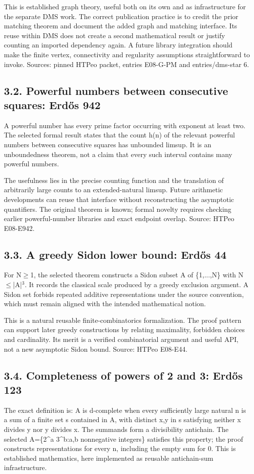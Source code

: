 \documentclass[11pt,a4paper]{article}
\begin{document}
This is established graph theory, useful both on its own and as infrastructure for the separate DMS work. The correct publication practice is to credit the prior matching theorem and document the added graph and matching interface. Its reuse within DMS does not create a second mathematical result or justify counting an imported dependency again. A future library integration should make the finite vertex, connectivity and regularity assumptions straightforward to invoke. Sources: pinned HTPeo packet, entries E08-G-PM and entries/dms-star 6.

\subsection{3.2. Powerful numbers between consecutive squares: Erdős 942}
A powerful number has every prime factor occurring with exponent at least two. The selected formal result states that the count h(n) of the relevant powerful numbers between consecutive squares has unbounded limsup. It is an unboundedness theorem, not a claim that every such interval contains many powerful numbers.

The usefulness lies in the precise counting function and the translation of arbitrarily large counts to an extended-natural limsup. Future arithmetic developments can reuse that interface without reconstructing the asymptotic quantifiers. The original theorem is known; formal novelty requires checking earlier powerful-number libraries and exact endpoint overlap. Source: HTPeo E08-E942.

\subsection{3.3. A greedy Sidon lower bound: Erdős 44}
For N\ensuremath{\geq}1, the selected theorem constructs a Sidon subset A of \{1,...,N\} with N\ensuremath{\leq}|A|\ensuremath{^3}. It records the classical scale produced by a greedy exclusion argument. A Sidon set forbids repeated additive representations under the source convention, which must remain aligned with the intended mathematical notion.

This is a natural reusable finite-combinatorics formalization. The proof pattern can support later greedy constructions by relating maximality, forbidden choices and cardinality. Its merit is a verified combinatorial argument and useful API, not a new asymptotic Sidon bound. Source: HTPeo E08-E44.

\subsection{3.4. Completeness of powers of 2 and 3: Erdős 123}
The exact definition is: A is d-complete when every sufficiently large natural n is a sum of a finite set s contained in A, with distinct x,y in s satisfying neither x divides y nor y divides x. The summands form a divisibility antichain. The selected A=\{2\textasciicircum{}a 3\textasciicircum{}b:a,b nonnegative integers\} satisfies this property; the proof constructs representations for every n, including the empty sum for 0. This is established mathematics, here implemented as reusable antichain-sum infrastructure.
\end{document}
